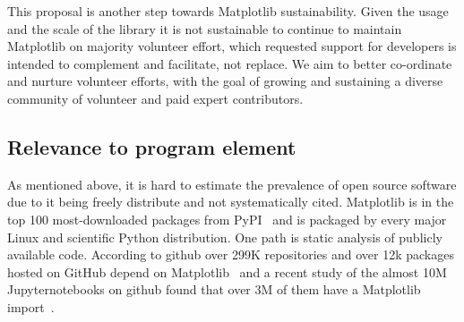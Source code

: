 \documentclass[12pt]{article}
\numberwithin{page}{section}
\begin{document}
This proposal is another step towards Matplotlib sustainability.
Given the usage and the scale of the library it is not sustainable to
continue to maintain Matplotlib on majority volunteer effort, which
requested support for developers is intended to complement and
facilitate, not replace.  We aim to better co-ordinate and nurture
volunteer efforts, with the goal of growing and sustaining a diverse
community of volunteer and paid expert contributors.


\subsection{Relevance to program element}

As mentioned above, it is hard to estimate the prevalence of open
source software due to it being freely distribute and not
systematically cited.  Matplotlib is in the top 100 most-downloaded
packages from PyPI~\cite{pypi_stats} and is packaged by every major
Linux and scientific Python distribution.  One path is static analysis
of publicly available code.  According to github over 299K
repositories and over 12k packages hosted on GitHub depend on
Matplotlib~\cite{gh_deps:2021} and a recent study of the almost 10M
Jupyternotebooks on github found that over 3M of them have a
Matplotlib import~\cite{datalore:2020}.
\end{document}
